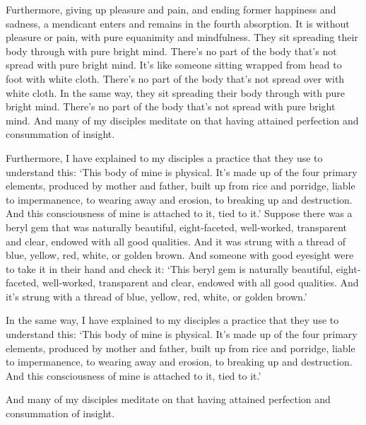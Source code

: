 \documentclass[12pt,openany]{book}%
\begin{document}
Furthermore, giving up pleasure and pain, and ending former happiness and sadness, a mendicant enters and remains in the fourth absorption. It is without pleasure or pain, with pure equanimity and mindfulness. They sit spreading their body through with pure bright mind. There’s no part of the body that’s not spread with pure bright mind. It’s like someone sitting wrapped from head to foot with white cloth. There’s no part of the body that’s not spread over with white cloth. In the same way, they sit spreading their body through with pure bright mind. There’s no part of the body that’s not spread with pure bright mind. And many of my disciples meditate on that having attained perfection and consummation of insight. 

Furthermore, I have explained to my disciples a practice that they use to understand this: ‘This body of mine is physical. It’s made up of the four primary elements, produced by mother and father, built up from rice and porridge, liable to impermanence, to wearing away and erosion, to breaking up and destruction. And this consciousness of mine is attached to it, tied to it.’ Suppose there was a beryl gem that was naturally beautiful, eight-faceted, well-worked, transparent and clear, endowed with all good qualities. And it was strung with a thread of blue, yellow, red, white, or golden brown. And someone with good eyesight were to take it in their hand and check it: ‘This beryl gem is naturally beautiful, eight-faceted, well-worked, transparent and clear, endowed with all good qualities. And it’s strung with a thread of blue, yellow, red, white, or golden brown.’ 

In the same way, I have explained to my disciples a practice that they use to understand this: ‘This body of mine is physical. It’s made up of the four primary elements, produced by mother and father, built up from rice and porridge, liable to impermanence, to wearing away and erosion, to breaking up and destruction. And this consciousness of mine is attached to it, tied to it.’ 

And many of my disciples meditate on that having attained perfection and consummation of insight. 
\end{document}
